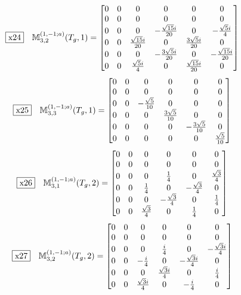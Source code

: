 \documentclass[fleqn,10pt,landscape]{jsarticle}
\begin{document}
\begin{dmath*}
\fbox{x24}\quad \mathbb{M}_{3,2}^{(1,-1;a)}(T_{g},1)=\begin{bmatrix} 0 & 0 & 0 & 0 & 0 & 0 \\ 0 & 0 & 0 & 0 & 0 & 0 \\ 0 & 0 & 0 & - \frac{\sqrt{15} i}{20} & 0 & - \frac{\sqrt{5} i}{4} \\ 0 & 0 & \frac{\sqrt{15} i}{20} & 0 & \frac{3 \sqrt{5} i}{20} & 0 \\ 0 & 0 & 0 & - \frac{3 \sqrt{5} i}{20} & 0 & - \frac{\sqrt{15} i}{20} \\ 0 & 0 & \frac{\sqrt{5} i}{4} & 0 & \frac{\sqrt{15} i}{20} & 0 \end{bmatrix}
\end{dmath*}
\begin{dmath*}
\fbox{x25}\quad \mathbb{M}_{3,3}^{(1,-1;a)}(T_{g},1)=\begin{bmatrix} 0 & 0 & 0 & 0 & 0 & 0 \\ 0 & 0 & 0 & 0 & 0 & 0 \\ 0 & 0 & - \frac{\sqrt{5}}{10} & 0 & 0 & 0 \\ 0 & 0 & 0 & \frac{3 \sqrt{5}}{10} & 0 & 0 \\ 0 & 0 & 0 & 0 & - \frac{3 \sqrt{5}}{10} & 0 \\ 0 & 0 & 0 & 0 & 0 & \frac{\sqrt{5}}{10} \end{bmatrix}
\end{dmath*}
\begin{dmath*}
\fbox{x26}\quad \mathbb{M}_{3,1}^{(1,-1;a)}(T_{g},2)=\begin{bmatrix} 0 & 0 & 0 & 0 & 0 & 0 \\ 0 & 0 & 0 & 0 & 0 & 0 \\ 0 & 0 & 0 & \frac{1}{4} & 0 & \frac{\sqrt{3}}{4} \\ 0 & 0 & \frac{1}{4} & 0 & - \frac{\sqrt{3}}{4} & 0 \\ 0 & 0 & 0 & - \frac{\sqrt{3}}{4} & 0 & \frac{1}{4} \\ 0 & 0 & \frac{\sqrt{3}}{4} & 0 & \frac{1}{4} & 0 \end{bmatrix}
\end{dmath*}
\begin{dmath*}
\fbox{x27}\quad \mathbb{M}_{3,2}^{(1,-1;a)}(T_{g},2)=\begin{bmatrix} 0 & 0 & 0 & 0 & 0 & 0 \\ 0 & 0 & 0 & 0 & 0 & 0 \\ 0 & 0 & 0 & \frac{i}{4} & 0 & - \frac{\sqrt{3} i}{4} \\ 0 & 0 & - \frac{i}{4} & 0 & - \frac{\sqrt{3} i}{4} & 0 \\ 0 & 0 & 0 & \frac{\sqrt{3} i}{4} & 0 & \frac{i}{4} \\ 0 & 0 & \frac{\sqrt{3} i}{4} & 0 & - \frac{i}{4} & 0 \end{bmatrix}
\end{dmath*}
\end{document}
